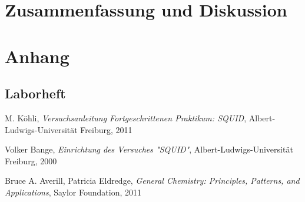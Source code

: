\documentclass[12pt]{article}
\begin{document}
\newpage
\section{Zusammenfassung und Diskussion}


\newpage
\section{Anhang}




%


%

\subsection{Laborheft}

\newpage
\listoffigures


\newpage
\thispagestyle{empty}
\begin{thebibliography}{9}

  

  
  

M. Köhli,
\emph{Versuchsanleitung Fortgeschrittenen Praktikum: SQUID},
Albert-Ludwigs-Universität Freiburg,
2011

Volker Bange,
\emph{Einrichtung des Versuches "SQUID"},
Albert-Ludwigs-Universität Freiburg,
2000

Bruce A. Averill, Patricia Eldredge,
\emph{General Chemistry: Principles, Patterns, and Applications},
Saylor Foundation,
2011
\end{thebibliography}
\end{document}
